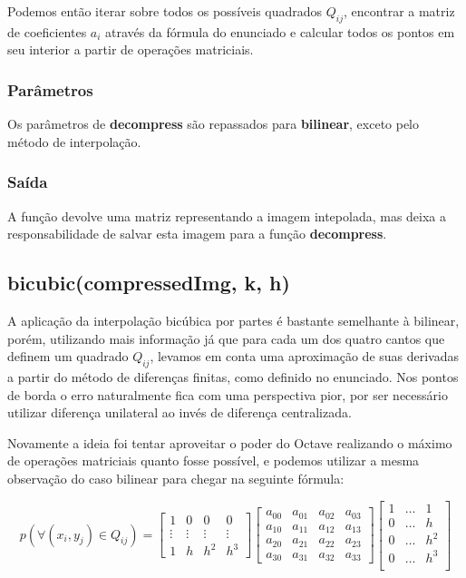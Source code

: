 \documentclass[leqno]{article}
\begin{document}
Podemos então iterar sobre todos os possíveis quadrados $Q_{ij}$, encontrar a
matriz de coeficientes $a_i$ através da fórmula do enunciado e calcular todos
os pontos em seu interior a partir de operações matriciais.

\subsubsection{Parâmetros}
Os parâmetros de \textbf{decompress} são repassados para \textbf{bilinear},
exceto pelo método de interpolação.

\subsubsection{Saída}
A função devolve uma matriz representando a imagem intepolada, mas deixa a
responsabilidade de salvar esta imagem para a função \textbf{decompress}.


\subsection{bicubic(compressedImg, k, h)}
A aplicação da interpolação bicúbica por partes é bastante semelhante à bilinear,
porém, utilizando mais informação já que para cada um dos quatro cantos que
definem um quadrado $Q_{ij}$, levamos em conta uma aproximação de suas derivadas
a partir do método de diferenças finitas, como definido no enunciado. Nos pontos
de borda o erro naturalmente fica com uma perspectiva pior, por ser necessário
utilizar diferença unilateral ao invés de diferença centralizada.

Novamente a ideia foi tentar aproveitar o poder do Octave realizando o máximo
de operações matriciais quanto fosse possível, e podemos utilizar a mesma
observação do caso bilinear para chegar na seguinte fórmula:

$$ p(\forall(x_i, y_j) \in Q_{ij}) = \begin{bmatrix}
    1   &    0   &    0   &    0     \\
 \vdots & \vdots & \vdots & \vdots   \\ 
    1   &    h   &   h^2  &   h^3
 \end{bmatrix}
 \begin{bmatrix}
     a_{00}   & a_{01} & a_{02} & a_{03}      \\
     a_{10}   & a_{11} & a_{12} & a_{13}      \\
     a_{20}   & a_{21} & a_{22} & a_{23}      \\
     a_{30}   & a_{31} & a_{32} & a_{33}     
  \end{bmatrix} 
  \begin{bmatrix}
     1  & \ldots   & 1      \\
     0  & \ldots   & h      \\
     0  & \ldots   & h^2    \\
     0  & \ldots   & h^3    \\
  \end{bmatrix} $$
\end{document}
